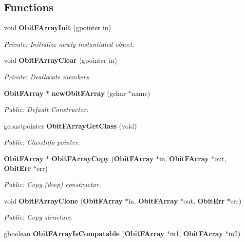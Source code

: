 \subsection*{Functions}
\begin{CompactItemize}
\item 
void {\bf Obit\-FArray\-Init} (gpointer in)
\begin{CompactList}\small\item\em Private: Initialize newly instantiated object. \item\end{CompactList}\item 
void {\bf Obit\-FArray\-Clear} (gpointer in)
\begin{CompactList}\small\item\em Private: Deallocate members. \item\end{CompactList}\item 
{\bf Obit\-FArray} $\ast$ {\bf new\-Obit\-FArray} (gchar $\ast$name)
\begin{CompactList}\small\item\em Public: Default Constructor. \item\end{CompactList}\item 
gconstpointer {\bf Obit\-FArray\-Get\-Class} (void)
\begin{CompactList}\small\item\em Public: Class\-Info pointer. \item\end{CompactList}\item 
{\bf Obit\-FArray} $\ast$ {\bf Obit\-FArray\-Copy} ({\bf Obit\-FArray} $\ast$in, {\bf Obit\-FArray} $\ast$out, {\bf Obit\-Err} $\ast$err)
\begin{CompactList}\small\item\em Public: Copy (deep) constructor. \item\end{CompactList}\item 
void {\bf Obit\-FArray\-Clone} ({\bf Obit\-FArray} $\ast$in, {\bf Obit\-FArray} $\ast$out, {\bf Obit\-Err} $\ast$err)
\begin{CompactList}\small\item\em Public: Copy structure. \item\end{CompactList}\item 
gboolean {\bf Obit\-FArray\-Is\-Compatable} ({\bf Obit\-FArray} $\ast$in1, {\bf Obit\-FArray} $\ast$in2)

\end{CompactItemize}
